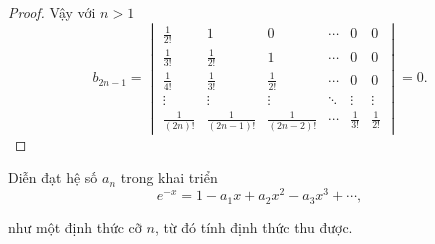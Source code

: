 \documentclass[class=linear-algebra,crop=false]{standalone}
\begin{document}
\begin{proof}
	\par Vậy với $n > 1$
	\[
		b_{2n-1} =
		\begin{vmatrix}
			\frac{1}{2!}    & 1                 & 0                 & \cdots & 0            & 0            \\
			\frac{1}{3!}    & \frac{1}{2!}      & 1                 & \cdots & 0            & 0            \\
			\frac{1}{4!}    & \frac{1}{3!}      & \frac{1}{2!}      & \cdots & 0            & 0            \\
			\vdots          & \vdots            & \vdots            & \ddots & \vdots       & \vdots       \\
			\frac{1}{(2n)!} & \frac{1}{(2n-1)!} & \frac{1}{(2n-2)!} & \cdots & \frac{1}{3!} & \frac{1}{2!}
		\end{vmatrix}
		= 0.
	\]
\end{proof}

\begin{exercise}
	\par Diễn đạt hệ số $a_{n}$ trong khai triển
	\[
		e^{-x} = 1 - a_{1}x + a_{2}x^{2} - a_{3}x^{3} + \cdots ,
	\]
	\par như một định thức cỡ $n$, từ đó tính định thức thu được.
\end{exercise}
\end{document}
